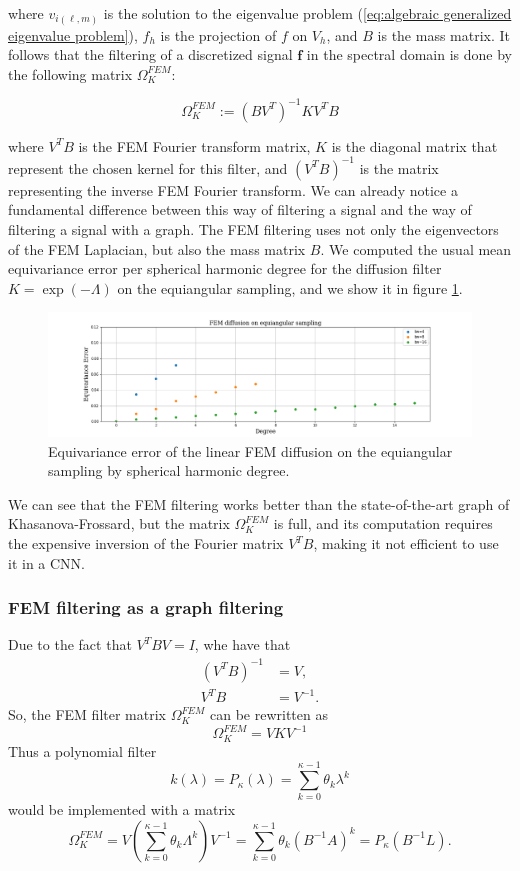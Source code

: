 where $v_{i(\ell, m)}$ is the solution to the eigenvalue problem (\ref{eq:algebraic generalized eigenvalue problem}), $f_h$ is the projection of $f$ on $V_h$, and $B$ is the mass matrix. It follows that the filtering of a discretized signal $\mathbf f$ in the spectral domain is done by the following matrix  $\Omega_K^{FEM}$:

\begin{equation}\label{eq:FEM filtering}
	 \Omega_K^{FEM} := (BV^T)^{-1}KV^TB
\end{equation}

where $V^TB$ is the FEM Fourier transform matrix, $K$ is the diagonal matrix that represent the chosen kernel for this filter, and $(V^TB)^{-1}$ is the matrix representing the inverse FEM Fourier transform. We can already notice a fundamental difference between this way of filtering a signal and the way of filtering a signal with a graph. The FEM filtering uses not only the eigenvectors of the FEM Laplacian, but also the mass matrix $B$. We computed the usual mean equivariance error per spherical harmonic degree for the diffusion filter $K=\exp(-\Lambda)$ on the equiangular sampling, and we show it in figure \ref{fig:FEM diffusion}.
\begin{figure}[h]
	\centering
	\includegraphics[width=\textwidth]{../codes/06.Equivariance_error/FEMdiffusiononequiangularsampling.png}
	\caption{\label{fig:FEM diffusion}Equivariance error of the linear FEM diffusion on the equiangular sampling by spherical harmonic degree.}
\end{figure}
We can see that the FEM filtering works better than the state-of-the-art graph of Khasanova-Frossard, but the matrix $\Omega_K^{FEM}$ is full, and its computation requires the expensive inversion of the Fourier matrix $V^TB$, making it not efficient to use it in a CNN. 
\subsubsection{FEM filtering as a graph filtering}\label{sec:FEM filtering as a graph filtering}
Due to the fact that 
$
V^TBV = I
$,
whe have that 
$$
\begin{aligned}
	(V^TB)^{-1} &= V,\\
	V^TB &= V^{-1}.
\end{aligned}
$$
So, the FEM filter matrix $\Omega_K^{FEM}$ can be rewritten as 
\begin{equation}\label{eq:FEM filter simple}
	 \Omega_K^{FEM}  = V K V^{-1}
\end{equation}
Thus a polynomial filter
$$
k(\lambda)=P_\kappa(\lambda) = \sum_{k=0}^{\kappa-1} \theta_k \lambda^k
$$
would be implemented with a matrix
$$
\Omega_K^{FEM} = V \left(\sum_{k=0}^{\kappa-1} \theta_k \Lambda^k \right)V^{-1} = \sum_{k=0}^{\kappa-1} \theta_k (B^{-1}A)^k = P_\kappa(B^{-1}L).
$$

